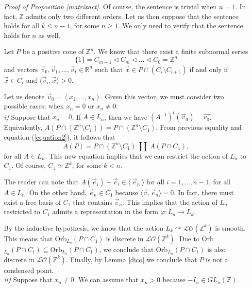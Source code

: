 \documentclass[12pt]{article}
\theoremstyle{definition}
\begin{document}
\noindent\textit{Proof of Proposition \ref{matrixact}. } Of course, the sentence is trivial when $n=1$. In fact, $\mathbb{Z}$ admits only two different orders. Let us then suppose that the sentence holds for all $k\leq n-1$, for some $n\geq 1$. We only need to verify that the sentence holds for $n$ as well.

Let $P$ be a positive cone of $\mathbb{Z}^n$. We know that there exist a finite subnormal series
    $$\{1\}=C_{m+1}\vartriangleleft C_m \vartriangleleft\dots\vartriangleleft C_0=\mathbb{Z}^n$$
    and vectors $\vec{v}_0,\vec{v}_1,\dots,\vec{v}_t\in \mathbb{R}^n$ such that $\vec{x}\in P\cap(C_i\setminus C_{i+1})$ if and only if $\vec{x}\in C_i$ and $\langle\vec{v}_i,\vec{x}\rangle>0$.
    
Let us denote $\vec{v}_0=(x_1,\dots, x_n)$. Given this vector, we must consider two possible cases: when $x_n=0$ or $x_n\neq 0$.\\

\noindent\textit{i)} Suppose that $x_n=0$. 
If $A\in L_n$, then we have $(A^{-1})^t(\vec{v}_0)=\vec{v_0}$. Equivalently, $A(P\cap (\mathbb{Z}^n\setminus C_1))= P\cap (\mathbb{Z}^n\setminus C_1)$.
        From previous equality and equation (\ref{equation2}), it follows that 
        $$A(P)=P\cap (\mathbb{Z}^n\setminus C_1)\ \amalg\ A(P\cap C_1),$$
        for all $A\in L_n$.
        This new equation implies that we can restrict the action of $L_n$ to $C_1$. Of course, $C_1\simeq \mathbb{Z}^{k}$, for some $k<n$.
 

The reader can note that $A(\vec{e}_i) - \vec{e}_i\in \langle\ \vec{e}_n\ \rangle$ for all $i=1,\dots, n-1$, for all $A\in L_n$. On the other hand, $\vec{e}_n\in C_1$ because $\langle\vec{v},\vec{e}_n\rangle=0$. In fact, there must exist a free basis of $C_1$ that contains $\vec{e}_n$.
This implies that the action of $L_n$ restricted to $C_1$ admits a representation in the form $\varphi:L_n\rightarrow L_{k}$.


By the inductive hypothesis, we know that the action $L_k\curvearrowright\mathcal{LO}(\mathbb{Z}^{k})$ is smooth. This means that Orb$_{L_{k}}(P\cap C_1)$ is discrete in $\mathcal{LO}(\mathbb{Z}^{k})$. Due to Orb$_{L_n}(P\cap C_1)\subseteq \text{Orb}_{L_{k}}(P\cap C_1)$, we conclude that Orb$_{L_n}(P\cap C_1)$ is also discrete in $\mathcal{LO}(\mathbb{Z}^{k})$. Finally, by Lemma \ref{dico} we conclude that $P$ is not a condensed point.\\

\noindent\textit{ii)} Suppose that $x_n\neq0$.
We can assume that $x_n>0$ because $-I_n\in GL_{n}(\mathbb{Z})$.
\end{document}
